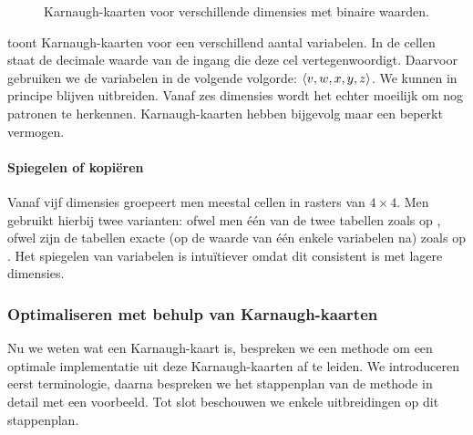 \begin{figure}[hbt]
\centering
{}
\caption{Karnaugh-kaarten voor verschillende dimensies met binaire waarden.}
\end{figure}

 toont Karnaugh-kaarten voor een verschillend aantal variabelen. In de cellen staat de decimale waarde van de ingang die deze cel vertegenwoordigt. Daarvoor gebruiken we de variabelen in de volgende volgorde: $\left\langle v,w,x,y,z \right\rangle$. We kunnen in principe blijven uitbreiden. Vanaf zes dimensies wordt het echter moeilijk om nog patronen te herkennen. Karnaugh-kaarten hebben bijgevolg maar een beperkt vermogen.

\paragraph{Spiegelen of kopi\"eren}
Vanaf vijf dimensies groepeert men meestal cellen in rasters van $4\times 4$. Men gebruikt hierbij twee varianten: ofwel  men \'e\'en van de twee tabellen zoals op , ofwel zijn de tabellen exacte  (op de waarde van \'e\'en enkele variabelen na) zoals op . Het spiegelen van variabelen is intu\"itiever omdat dit consistent is met lagere dimensies.

\subsubsection{Optimaliseren met behulp van Karnaugh-kaarten}
Nu we weten wat een Karnaugh-kaart is, bespreken we een methode om een optimale implementatie uit deze Karnaugh-kaarten af te leiden. We introduceren eerst terminologie, daarna bespreken we het stappenplan van de methode in detail met een voorbeeld. Tot slot beschouwen we enkele uitbreidingen op dit stappenplan.

